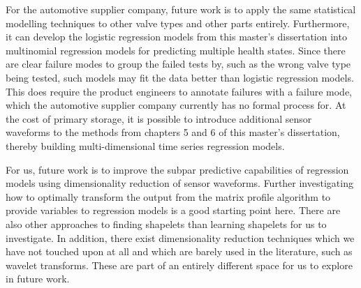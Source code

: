 For the automotive supplier company, future work is to apply the same statistical modelling techniques to other valve types and other parts entirely.
Furthermore, it can develop the logistic regression models from this master's dissertation into multinomial regression models for predicting multiple health states.
Since there are clear failure modes to group the failed tests by, such as the wrong valve type being tested, such models may fit the data better than logistic regression models.
This does require the product engineers to annotate failures with a failure mode, which the automotive supplier company currently has no formal process for.
At the cost of primary storage, it is possible to introduce additional sensor waveforms to the methods from chapters 5 and 6 of this master's dissertation, thereby building multi-dimensional time series regression models.

For us, future work is to improve the subpar predictive capabilities of regression models using dimensionality reduction of sensor waveforms.
Further investigating how to optimally transform the output from the matrix profile algorithm to provide variables to regression models is a good starting point here.
There are also other approaches to finding shapelets than learning shapelets for us to investigate.
In addition, there exist dimensionality reduction techniques which we have not touched upon at all and which are barely used in the literature, such as wavelet transforms.
These are part of an entirely different space for us to explore in future work.
